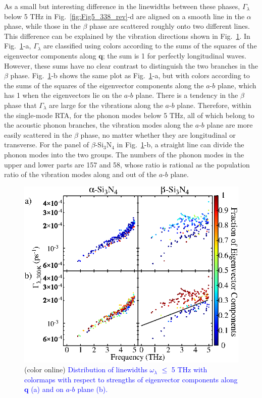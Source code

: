 \documentclass[twocolumn,amsmath,amssymb,a4paper,prb,superscriptaddress,floatfix]{revtex4-1}
\begin{document}
As a small but interesting difference in the linewidths between these phases,
$\Gamma_\lambda$ below 5 THz in Fig.~\ref{fig:Fig5_338_rev}-d are aligned on a
smooth line in the $\alpha$ phase, while those in the $\beta$ phase are
scattered roughly onto two different lines. This difference can be explained by
the vibration directions shown in Fig.~\ref{fig:Fig7_338}. In
Fig.~\ref{fig:Fig7_338}-a, $\Gamma_\lambda$ are classified using colors
according to the sums of the squares of the eigenvector components along $\mathbf{q}$; the
sum is 1 for perfectly longitudinal waves. However, these sums have no clear
contrast to distinguish the two branches in the $\beta$ phase.
Fig.~\ref{fig:Fig7_338}-b shows the same plot as Fig.~\ref{fig:Fig7_338}-a, but
with colors according to the sums of the squares of the eigenvector components
along the $a$-$b$ plane, which has 1 when the eigenvectors lie on the $a$-$b$
plane. There is a tendency in the $\beta$ phase that  $\Gamma_\lambda$ are
large for the vibrations along the $a$-$b$ plane. Therefore, within the
single-mode RTA, for the phonon modes below 5 THz, all of which belong to the
acoustic phonon branches, the vibration modes along the $a$-$b$ plane are more
easily scattered in the $\beta$ phase, no matter whether they are longitudinal
or transverse. For the panel of $\beta$-Si$_3$N$_4$ in
Fig.~\ref{fig:Fig7_338}-b, a straight line can divide the phonon modes into the
two groups. The numbers of the phonon modes in the upper and lower parts are
157 and 58, whose ratio is rational as the population ratio of the vibration
modes along and out of the $a$-$b$ plane.


\begin{figure}[ht]
 \centering
  \includegraphics[width=\linewidth]{figure_analyze_gamma3_m1010_print.eps} \caption{(color
	  online) \textcolor{blue}{Distribution of linewidths $\omega_\lambda$ $\leq$ 5 THz
		  with colormaps with respect to strengths of eigenvector components along $\mathbf q$ (a)
		  and on $a$-$b$ plane (b).} \label{fig:Fig7_338}} 
 \centering
\end{figure}
\end{document}
